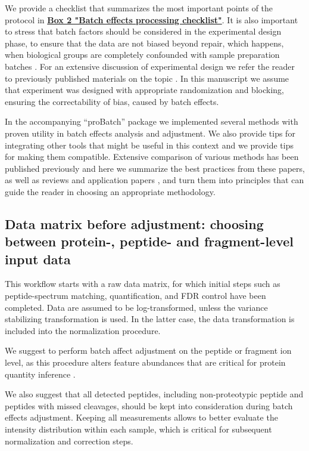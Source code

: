 \documentclass[num-refs]{wiley-article}
\begin{document}
We provide a checklist that summarizes the most important points of the protocol in \textbf{\hyperref[box:Box2_checklist]{Box 2 "Batch effects processing checklist"}}.
It is also important to stress that batch factors should be considered in the experimental design phase, to ensure that the data are not biased beyond repair, which happens, when biological groups are completely confounded with sample preparation batches  \cite{Hu2005, Gilad2015}. For an extensive discussion of experimental design we refer the reader to previously published materials on the topic \cite{Oberg2009, Cuklina2020}. In this manuscript we assume that experiment was designed with appropriate randomization and blocking, ensuring the correctability of bias, caused by batch effects.

In the accompanying “proBatch” package we implemented several methods with proven utility in batch effects analysis and adjustment. We also provide tips for integrating other tools that might be useful in this context and we provide tips for making them compatible. Extensive comparison of various methods has been published previously \cite{Chawade:2014aa, Luo2010} and here we summarize the best practices from these papers, as well as reviews \cite{Lazar:2013aa, Leek:2010aa}  and application papers \cite{Sajic2018, Collins2017}, and turn them into principles that can guide the reader in choosing an appropriate methodology. 

\subsection{Data matrix before adjustment: choosing between protein-, peptide- and fragment-level input data}
This workflow starts with a raw data matrix, for which initial steps such as peptide-spectrum matching, quantification, and FDR control have been completed. Data are assumed to be log-transformed, unless the variance stabilizing transformation \cite{Durbin2002} is used. In the latter case, the data transformation is included into the normalization procedure. 

We suggest to perform batch affect adjustment on the peptide or fragment ion level, as this procedure alters feature abundances that are critical for protein quantity inference \cite{Clough:2012aa, Teo:2015aa}.  

We also suggest that all detected peptides, including non-proteotypic peptide and peptides with missed cleavages, should be kept into consideration during batch effects adjustment. Keeping all measurements allows to better evaluate the intensity distribution within each sample, which is critical for subsequent normalization and correction steps.
\end{document}
